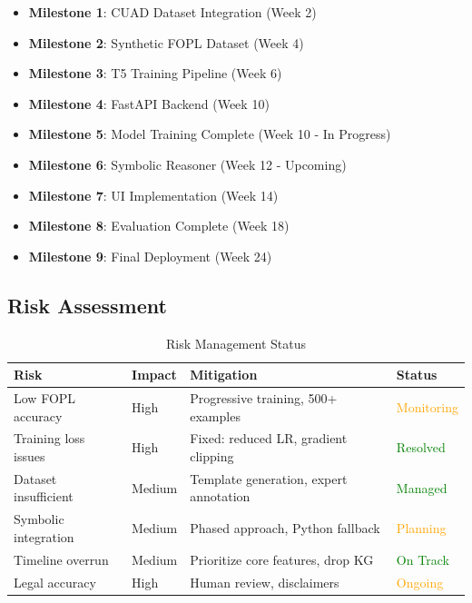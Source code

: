 \documentclass[12pt,a4paper]{article}
\begin{document}
\begin{itemize}
    \item[\textcolor{green}{✓}] \textbf{Milestone 1}: CUAD Dataset Integration (Week 2)
    \item[\textcolor{green}{✓}] \textbf{Milestone 2}: Synthetic FOPL Dataset (Week 4)
    \item[\textcolor{green}{✓}] \textbf{Milestone 3}: T5 Training Pipeline (Week 6)
    \item[\textcolor{green}{✓}] \textbf{Milestone 4}: FastAPI Backend (Week 10)
    \item[\textcolor{orange}{⚙}] \textbf{Milestone 5}: Model Training Complete (Week 10 - In Progress)
    \item[\textcolor{red}{✗}] \textbf{Milestone 6}: Symbolic Reasoner (Week 12 - Upcoming)
    \item[\textcolor{red}{✗}] \textbf{Milestone 7}: UI Implementation (Week 14)
    \item[\textcolor{red}{✗}] \textbf{Milestone 8}: Evaluation Complete (Week 18)
    \item[\textcolor{red}{✗}] \textbf{Milestone 9}: Final Deployment (Week 24)
\end{itemize}

\subsection{Risk Assessment}

\begin{table}[H]
\centering
\small
\begin{tabular}{|p{3.5cm}|l|p{4cm}|p{3cm}|}
\hline
\textbf{Risk} & \textbf{Impact} & \textbf{Mitigation} & \textbf{Status} \\
\hline
Low FOPL accuracy & High & Progressive training, 500+ examples & \textcolor{orange}{Monitoring} \\
\hline
Training loss issues & High & Fixed: reduced LR, gradient clipping & \textcolor{green}{Resolved} \\
\hline
Dataset insufficient & Medium & Template generation, expert annotation & \textcolor{green}{Managed} \\
\hline
Symbolic integration & Medium & Phased approach, Python fallback & \textcolor{orange}{Planning} \\
\hline
Timeline overrun & Medium & Prioritize core features, drop KG & \textcolor{green}{On Track} \\
\hline
Legal accuracy & High & Human review, disclaimers & \textcolor{orange}{Ongoing} \\
\hline
\end{tabular}
\caption{Risk Management Status}
\end{table}
\end{document}
